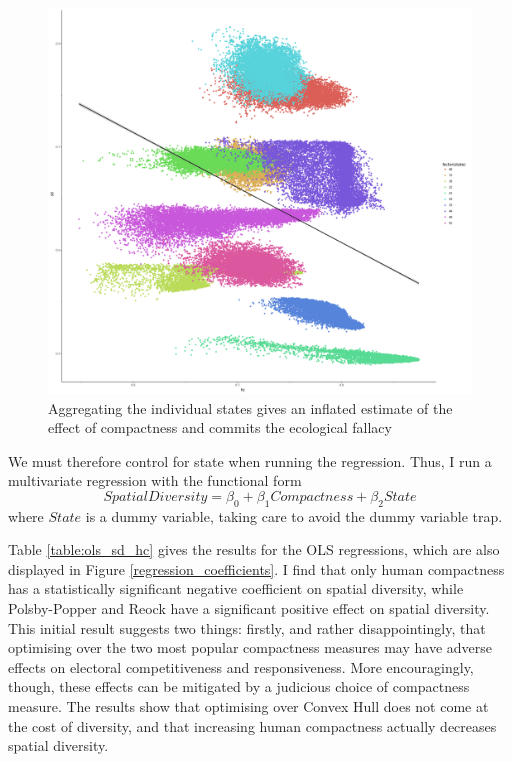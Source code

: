 \documentclass[]{article}
\begin{document}
\begin{figure}
\centering
\includegraphics{../30_results/grouped_regressions.png}
\caption{Aggregating the individual states gives an inflated estimate of
the effect of compactness and commits the ecological fallacy
\label{grouped_reg}}
\end{figure}

We must therefore control for state when running the regression. Thus, I
run a multivariate regression with the functional form
\[SpatialDiversity = \beta_0 +
\beta_1 Compactness + \beta_2 State\] where \(State\) is a dummy
variable, taking care to avoid the dummy variable trap.

Table \ref{table:ols_sd_hc} gives the results for the OLS regressions,
which are also displayed in Figure \ref{regression_coefficients}. I find
that only human compactness has a statistically significant negative
coefficient on spatial diversity, while Polsby-Popper and Reock have a
significant positive effect on spatial diversity. This initial result
suggests two things: firstly, and rather disappointingly, that
optimising over the two most popular compactness measures may have
adverse effects on electoral competitiveness and responsiveness. More
encouragingly, though, these effects can be mitigated by a judicious
choice of compactness measure. The results show that optimising over
Convex Hull does not come at the cost of diversity, and that increasing
human compactness actually decreases spatial diversity.
\end{document}
